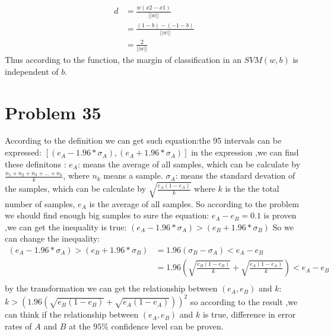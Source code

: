 \documentclass[12pt]{article}
\begin{document}
\begin{align*}
		d &= \frac{w(x2 - x1)}{||w||} \\
		&= \frac{(1 - b)- (-1 - b)}{||w||} \\
		&= \frac{2}{||w||}
\end{align*}
Thus according to the function, the margin of classification in an $SVM(w,b)$ is independent of $b$.

\section{Problem 35}
According to the definition we can get such equation:the 95%
intervals can be expressed:\newline
$[(e_{A} - 1.96 * \sigma_{A}), (e_{A} + 1.96 * \sigma_{A}) ]$\newline
in the expression ,we can find these definitons :\newline
$e_{A}$: means the average of all samples, which can be calculate by $\frac{n_{1} + n_{2} + n_{3} + ... + n_{k}}{k}$, where $n_{k}$ means a sample.\newline
$\sigma_{A}$: means the standard devation of the samples, which can be calculate by $\sqrt{\frac{e_{A}(1 - e_{A})}{k}}$ where $k$ is the the total number of samples, $e_{A}$ is the average of all samples.\newline
So according to the problem we should find enough big samples to sure the equation: $e_{A} - e_{B} = 0.1$ is proven ,we can get the inequality is true:\newline
$(e_{A} - 1.96 * \sigma_{A}) > (e_{B} + 1.96 * \sigma_{B})$\newline
So we can change the inequality:\newline
		\begin{align*}
			(e_{A} - 1.96 * \sigma_{A}) > (e_{B} + 1.96 * \sigma_{B}) &= 1.96(\sigma_{B} - \sigma_{A}) < e_{A} - e_{B} \\
			&= 1.96(\sqrt{\frac{e_{B}(1 - e_{B})}{k}}+ \sqrt{\frac{e_{A}(1 - e_{A})}{k}}) < e_{A} - e_{B} \\
		\end{align*}
by the transformation we can get the relationship between $(e_{A} , e_{B} )$ and $k$:\newline
$k > (1.96(\sqrt{e_{B}(1 - e_{B})} + \sqrt{e_{A}(1 - e_{A})}))^2$\newline
so according to the result ,we can think if the relationship between $(e_{A},e_{B})$ and $k$ is true, difference in error rates of $A$ and $B$ at the $95\%$ confidence level can be
proven.
\end{document}
